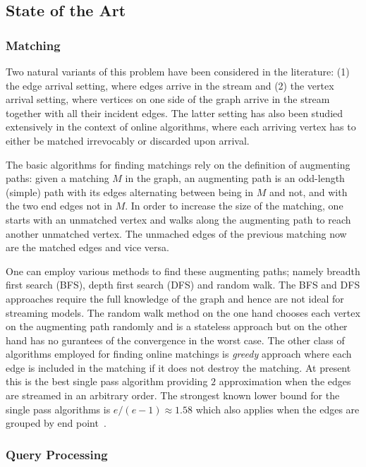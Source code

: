 \documentclass{scrartcl}
\begin{document}
\subsection{State of the Art}
\subsubsection{Matching}
Two natural variants of this problem have been considered in the literature: (1) the edge
arrival setting, where edges arrive in the stream and (2) the vertex arrival setting, where vertices on one
side of the graph arrive in the stream together with all their incident edges.
The latter setting has also
been studied extensively in the context of online algorithms, where each arriving vertex has to either be
matched irrevocably or discarded upon arrival.

The basic algorithms for finding matchings rely on the definition of augmenting paths:
given a matching $M$ in the graph, an augmenting path is an odd-length
(simple) path with its edges alternating between being in $M$
and not, and with the two end edges not in $M$. In order to increase the size of the matching, one starts with an unmatched vertex and walks along the augmenting path to reach another unmatched vertex. The unmached edges of the previous matching now are the matched edges and vice versa.

One can employ various methods to find these augmenting paths; namely breadth first search (BFS), depth first search (DFS) and random walk. The BFS and DFS approaches require the full knowledge of the graph and hence are not ideal for streaming models. The random walk method on the one hand chooses each vertex on the augmenting path randomly and is a stateless approach but on the other hand has no gurantees of the convergence in the worst case.
The other class of algorithms employed for finding online matchings is \emph{greedy} approach where each edge is included in the matching if it does not destroy the matching. At present this is the best single pass algorithm providing $2$ approximation when the edges are streamed in an arbitrary order. The strongest known lower bound for the single pass algorithms is $e/(e-1)\approx 1.58$ which also applies when the edges are grouped by end point~\cite{boundsKap,Goel}.

\subsubsection{Query Processing}
\end{document}
